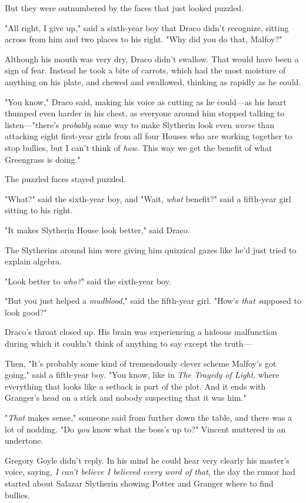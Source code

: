 But they were outnumbered by the faces that just looked puzzled.

"All right, I give up," said a sixth-year boy that Draco didn't recognize, 
sitting across from him and two places to his right. "Why did you do that, 
Malfoy?"

Although his mouth was very dry, Draco didn't swallow. That would have been a 
sign of fear. Instead he took a bite of carrots, which had the most moisture of 
anything on his plate, and chewed and swallowed, thinking as rapidly as he 
could.

"You know," Draco said, making his voice as cutting as he could---as his heart 
thumped even harder in his chest, as everyone around him stopped talking to 
listen---"there's \emph{probably} some way to make Slytherin look even 
\emph{worse} than attacking eight first-year girls from all four Houses who are 
working together to stop bullies, but I can't think of \emph{how}. This way we 
get the benefit of what Greengrass is doing."

The puzzled faces stayed puzzled.

"What?" said the sixth-year boy, and "Wait, \emph{what} benefit?" said a 
fifth-year girl sitting to his right.

"It makes Slytherin House look better," said Draco.

The Slytherins around him were giving him quizzical gazes like he'd just tried 
to explain algebra.

"Look better to \emph{who?}" said the sixth-year boy.

"But you just helped a \emph{mudblood}," said the fifth-year girl. "How's 
\emph{that s}upposed to look good?"

Draco's throat closed up. His brain was experiencing a hideous malfunction 
during which it couldn't think of anything to say except the truth---

Then, "It's probably some kind of tremendously clever scheme Malfoy's got 
going," said a fifth-year boy. "You know, like in \emph{The Tragedy of Light}, 
where everything that looks like a setback is part of the plot. And it ends 
with Granger's head on a stick and nobody suspecting that it was him."

"\emph{That} makes sense," someone said from further down the table, and there 
was a lot of nodding.
\sbreak
"Do \emph{you} know what the boss's up to?" Vincent muttered in an undertone.

Gregory Goyle didn't reply. In his mind he could hear very clearly his master's 
voice, saying,\emph{ I can't believe I believed every word of that}, the day 
the rumor had started about Salazar Slytherin showing Potter and Granger where 
to find bullies.

